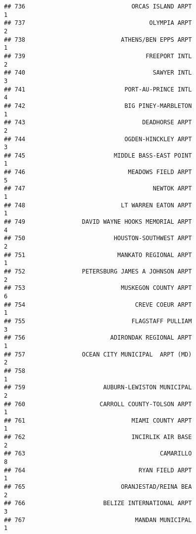 \documentclass[
]{article}
\begin{document}
\begin{verbatim}
## 736                              ORCAS ISLAND ARPT                           1
## 737                                   OLYMPIA ARPT                           2
## 738                           ATHENS/BEN EPPS ARPT                           1
## 739                                  FREEPORT INTL                           2
## 740                                    SAWYER INTL                           3
## 741                            PORT-AU-PRINCE INTL                           4
## 742                            BIG PINEY-MARBLETON                           1
## 743                                 DEADHORSE ARPT                           2
## 744                            OGDEN-HINCKLEY ARPT                           3
## 745                         MIDDLE BASS-EAST POINT                           1
## 746                             MEADOWS FIELD ARPT                           5
## 747                                    NEWTOK ARPT                           1
## 748                           LT WARREN EATON ARPT                           1
## 749                DAVID WAYNE HOOKS MEMORIAL ARPT                           4
## 750                         HOUSTON-SOUTHWEST ARPT                           2
## 751                          MANKATO REGIONAL ARPT                           1
## 752                PETERSBURG JAMES A JOHNSON ARPT                           2
## 753                           MUSKEGON COUNTY ARPT                           6
## 754                               CREVE COEUR ARPT                           1
## 755                              FLAGSTAFF PULLIAM                           3
## 756                        ADIRONDAK REGIONAL ARPT                           1
## 757                OCEAN CITY MUNICIPAL  ARPT (MD)                           2
## 758                                                                          1
## 759                      AUBURN-LEWISTON MUNICIPAL                           2
## 760                     CARROLL COUNTY-TOLSON ARPT                           1
## 761                              MIAMI COUNTY ARPT                           1
## 762                              INCIRLIK AIR BASE                           2
## 763                                      CAMARILLO                           8
## 764                                RYAN FIELD ARPT                           1
## 765                           ORANJESTAD/REINA BEA                           2
## 766                      BELIZE INTERNATIONAL ARPT                           3
## 767                               MANDAN MUNICIPAL                           1

\end{verbatim}
\end{document}
